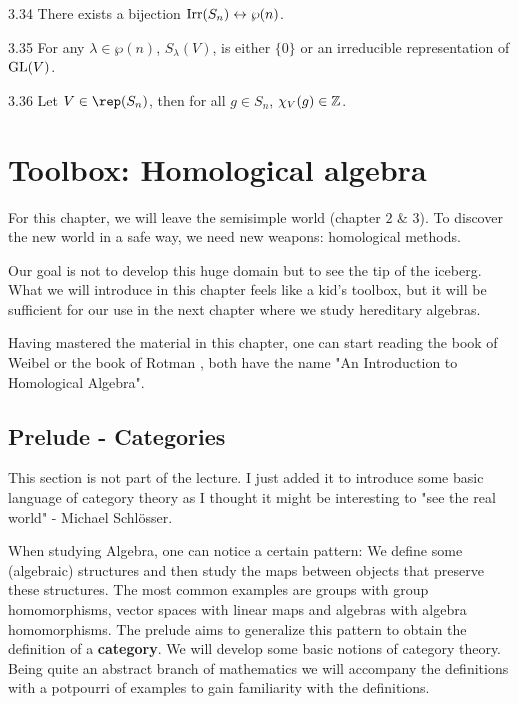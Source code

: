 \documentclass[twoside = false,	%
		headsepline,		%
		parskip = true,
		]{scrbook}						%
\begin{document}
        \begin{lemma}{}{3.34}
            There exists a bijection $\mathrm{Irr}(S_n) \leftrightarrow \wp(n)$.
        \end{lemma}

        \begin{corollary}{}{3.35}
            For any $\lambda \in \wp(n)$, $S_\lambda(V)$, is either $\{0\}$ or an irreducible representation of $\mathrm{GL}(V)$.
        \end{corollary}

        \begin{proposition}{}{3.36}
            Let $V \in \rep(S_n)$, then for all $g \in S_n$, $\chi_V(g) \in \mathbb Z$.
        \end{proposition}
\chapter{Toolbox: Homological algebra}
    For this chapter, we will leave the semisimple world (chapter $2$ \& $3$). To discover the new world in a safe way, we need new weapons: homological methods.
    
    Our goal is not to develop this huge domain but to see the tip of the iceberg. What we will introduce in this chapter feels like a kid's toolbox, but it will be sufficient for our use in the next chapter where we study hereditary algebras.

    Having mastered the material in this chapter, one can start reading the book of Weibel \cite{Weibel.2010} or the book of Rotman \cite{Rotman.2009}, both have the name "An Introduction to Homological Algebra".
\setcounter{section}{-1}
\section{Prelude - Categories}\label{cat}
    This section is not part of the lecture. I just added it to introduce some basic language of category theory as I thought it might be interesting to "see the real world" - Michael Schlösser.

    When studying Algebra, one can notice a certain pattern:
    We define some (algebraic) structures and then study the maps between objects that preserve these structures.
    The most common examples are groups with group homomorphisms, vector spaces with linear maps and algebras with algebra homomorphisms.
    The prelude aims to generalize this pattern to obtain the definition of a \textbf{category}.
    We will develop some basic notions of category theory.
    Being quite an abstract branch of mathematics we will accompany the definitions with a potpourri of examples
    to gain familiarity with the definitions.
    
\end{document}
